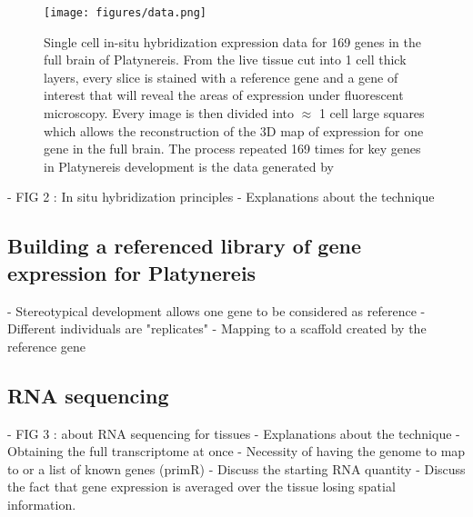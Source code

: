 \begin{figure}[h]
\centerline{\texttt{[image: figures/data.png]}}
\caption{Single cell in-situ hybridization expression data for 169 genes in the full brain of Platynereis. From the live tissue cut into 1 cell thick layers, every slice is stained with a reference gene and a gene of interest that will reveal the areas of expression under fluorescent microscopy. Every image is then divided into $\approx$ 1 cell large squares which allows the reconstruction of the 3D map of expression for one gene in the full brain. The process repeated 169 times for key genes in Platynereis development is the data generated by \cite{Tomer10}}\label{fig:insitu}
\end{figure}

    - FIG 2 : In situ hybridization principles
    - Explanations about the technique 

     \subsection{Building a referenced library of gene expression for Platynereis}
         - Stereotypical development allows one gene to be considered as reference
    - Different individuals are "replicates"
    - Mapping to a scaffold created by the reference gene

     \subsection{RNA sequencing}
    - FIG 3 : about RNA sequencing for tissues
    - Explanations about the technique
    - Obtaining the full transcriptome at once
    - Necessity of having the genome to map to or a list of known genes (primR) 
    - Discuss the starting RNA quantity 
    - Discuss the fact that gene expression is averaged over the tissue losing spatial information.

%
%
%
%
%




